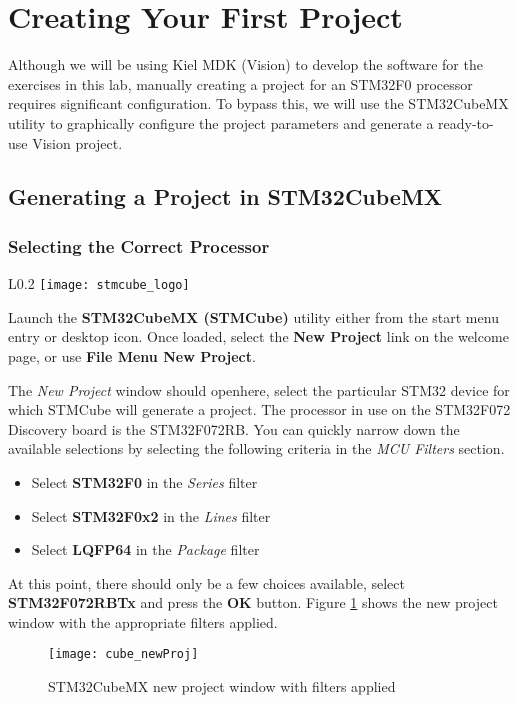 \documentclass[openany,11pt,fleqn]{book} %
\begin{document}
\section{Creating Your First Project}
Although we will be using Kiel MDK ({\textmu}Vision) to develop the software for the exercises in this lab, manually creating a project for an STM32F0 processor requires significant configuration. To bypass this, we will use the STM32CubeMX utility to graphically configure the project parameters and generate a ready-to-use {\textmu}Vision project. 

\subsection{Generating a Project in STM32CubeMX}
\subsubsection*{Selecting the Correct Processor}
\begin{wrapfigure}{L}{0.2\textwidth}
	\centering\texttt{[image: stmcube\_logo]}
\end{wrapfigure}

Launch the \textbf{STM32CubeMX (STMCube)} utility either from the start menu entry or desktop icon. Once loaded, select the \textbf{New Project} link on the welcome page, or use \textbf{File Menu \textrightarrow New Project}.

\noindent
The \textit{New Project} window should open\textemdash here, select the particular STM32 device for which STMCube will generate a project. The processor in use on the STM32F072 Discovery board is the STM32F072RB. You can quickly narrow down the available selections by selecting the following criteria in the \textit{MCU Filters} section.
\begin{itemize}
	\item Select \textbf{STM32F0} in the \textit{Series} filter
	\item Select \textbf{STM32F0x2} in the \textit{Lines} filter
	\item Select \textbf{LQFP64} in the \textit{Package} filter
\end{itemize}
At this point, there should only be a few choices available, select \textbf{STM32F072RBTx} and press the \textbf{OK} button. Figure \ref{cube_newProj} shows the new project window with the appropriate filters applied.

\begin{figure}[h]
	\centering\texttt{[image: cube\_newProj]}
	\caption{STM32CubeMX new project window with filters applied}
	\label{cube_newProj}
\end{figure}
\end{document}
